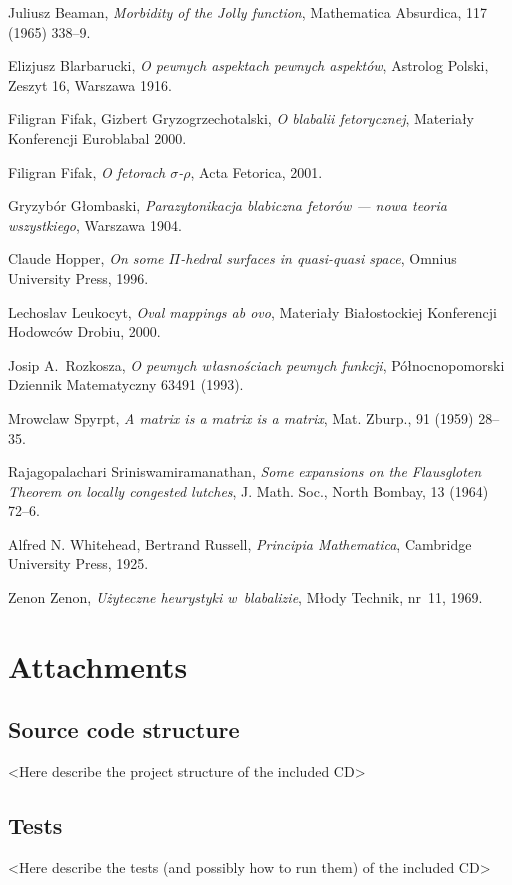 \documentclass[licencjacka,en]{pracamgr}
\begin{document}
\begin{thebibliography}{99}\label{r:bibliography}

 Juliusz Beaman, \textit{Morbidity of the Jolly
    function}, Mathematica Absurdica, 117 (1965) 338--9.

 Elizjusz Blarbarucki, \textit{O pewnych
    aspektach pewnych aspektów}, Astrolog Polski, Zeszyt 16, Warszawa
  1916.

 Filigran Fifak, Gizbert Gryzogrzechotalski,
  \textit{O blabalii fetorycznej}, Materiały Konferencji Euroblabal
  2000.

 Filigran Fifak, \textit{O fetorach
    $\sigma$-$\rho$}, Acta Fetorica, 2001.

 Gryzybór Głombaski, \textit{Parazytonikacja
    blabiczna fetorów --- nowa teoria wszystkiego}, Warszawa 1904.

 Claude Hopper, \textit{On some $\Pi$-hedral
    surfaces in quasi-quasi space}, Omnius University Press, 1996.

 Lechoslav Leukocyt, \textit{Oval mappings ab ovo},
  Materiały Białostockiej Konferencji Hodowców Drobiu, 2000.

 Josip A.~Rozkosza, \textit{O pewnych własnościach
    pewnych funkcji}, Północnopomorski Dziennik Matematyczny 63491
  (1993).

 Mrowclaw Spyrpt, \textit{A matrix is a matrix
    is a matrix}, Mat. Zburp., 91 (1959) 28--35.

 Rajagopalachari Sriniswamiramanathan,
  \textit{Some expansions on the Flausgloten Theorem on locally
    congested lutches}, J. Math.  Soc., North Bombay, 13 (1964) 72--6.

 Alfred N. Whitehead, Bertrand Russell,
  \textit{Principia Mathematica}, Cambridge University Press, 1925.

 Zenon Zenon, \textit{Użyteczne heurystyki
    w~blabalizie}, Młody Technik, nr~11, 1969.

\end{thebibliography}



\chapter*{Attachments}\label{r:attachments}

\section*{Source code structure}

<Here describe the project structure of the included CD>


\section*{Tests}

<Here describe the tests (and possibly how to run them) of the included CD>
\end{document}
